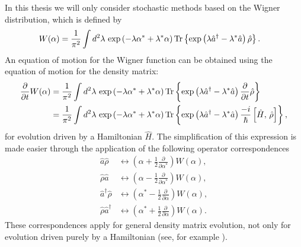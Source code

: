 In this thesis we will only consider stochastic methods based on the Wigner distribution, which is defined by \citep{Scully}
\begin{align}
    W(\alpha) &= \frac{1}{\pi^2} \int d^2 \lambda\, \exp\left(-\lambda \alpha^* + \lambda^* \alpha\right) \operatorname{Tr}\left\{ \exp\left(\lambda \hat{a}^\dagger - \lambda^* \hat{a}\right) \hat{\rho} \right\}.
\end{align}
An equation of motion for the Wigner function can be obtained using the equation of motion for the density matrix:
\begin{align}
    \frac{\partial}{\partial t} W(\alpha) &= \frac{1}{\pi^2} \int d^2 \lambda\, \exp\left(-\lambda \alpha^* + \lambda^* \alpha\right) \operatorname{Tr}\left\{ \exp\left(\lambda \hat{a}^\dagger - \lambda^* \hat{a}\right) \frac{\partial}{\partial t}\hat{\rho}\right\} \notag \\
    &= \frac{1}{\pi^2} \int d^2 \lambda\, \exp\left(-\lambda \alpha^* + \lambda^* \alpha\right) \operatorname{Tr}\left\{ \exp\left(\lambda \hat{a}^\dagger - \lambda^* \hat{a}\right) \frac{-i}{\hbar} \left[\hat{H},\, \hat{\rho} \right]\right\},
\end{align}
for evolution driven by a Hamiltonian $\hat{H}$.  The simplification of this expression is made easier through the application of the following operator correspondences \citep[\S 4.5]{GardinerQN}
\begin{subequations}
    \begin{align}
        \hat{a} \hat{\rho} &\leftrightarrow \left(\alpha + \frac{1}{2} \frac{\partial}{\partial \alpha^*} \right) W(\alpha), \\
        \hat{\rho} \hat{a} & \leftrightarrow \left(\alpha - \frac{1}{2} \frac{\partial}{\partial \alpha^*} \right) W(\alpha), \\
        \hat{a}^\dagger \hat{\rho} & \leftrightarrow \left( \alpha^* - \frac{1}{2} \frac{\partial}{\partial \alpha} \right) W(\alpha), \\
        \hat{\rho} \hat{a}^\dagger & \leftrightarrow \left( \alpha^* + \frac{1}{2} \frac{\partial}{\partial \alpha} \right) W(\alpha).
    \end{align}
\end{subequations}
These correspondences apply for general density matrix evolution, not only for evolution driven purely by a Hamiltonian (see, for example ).

